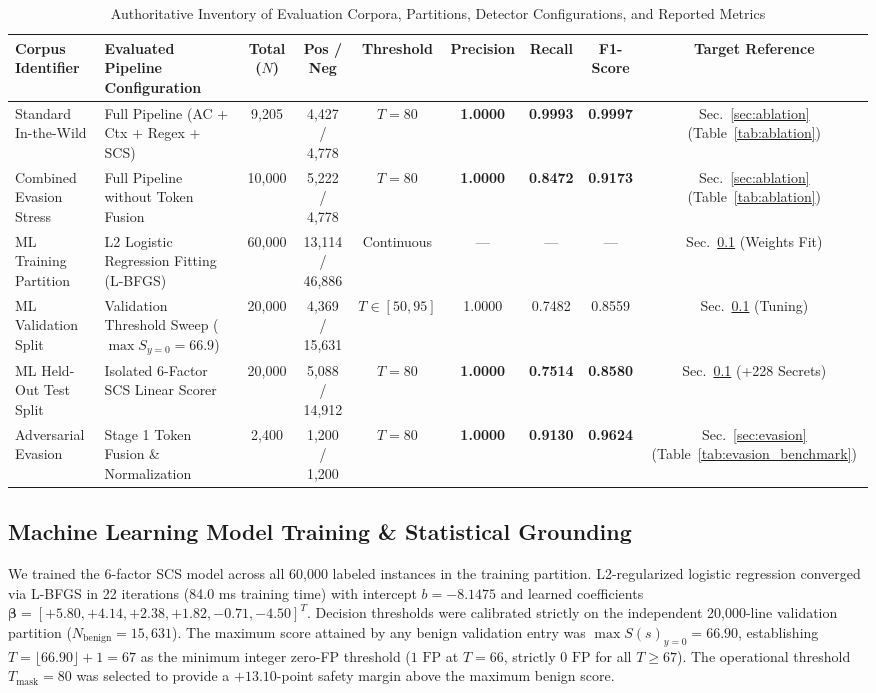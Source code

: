 \documentclass[conference]{IEEEtran}
\begin{document}
\begin{table}[t]
\caption{Authoritative Inventory of Evaluation Corpora, Partitions, Detector Configurations, and Reported Metrics}
\label{tab:dataset_inventory}
\centering
\footnotesize
\setlength{\tabcolsep}{3.5pt}
\begin{tabularx}{\textwidth}{p{2.8cm}Xccccccc}
\toprule
\textbf{Corpus Identifier} & \textbf{Evaluated Pipeline Configuration} & \textbf{Total ($N$)} & \textbf{Pos / Neg} & \textbf{Threshold} & \textbf{Precision} & \textbf{Recall} & \textbf{F1-Score} & \textbf{Target Reference} \\
\midrule
Standard In-the-Wild & Full Pipeline (AC + Ctx + Regex + SCS) & 9,205 & 4,427 / 4,778 & $T=80$ & \textbf{1.0000} & \textbf{0.9993} & \textbf{0.9997} & Sec.~\ref{sec:ablation} (Table~\ref{tab:ablation}) \\
Combined Evasion Stress & Full Pipeline without Token Fusion & 10,000 & 5,222 / 4,778 & $T=80$ & \textbf{1.0000} & \textbf{0.8472} & \textbf{0.9173} & Sec.~\ref{sec:ablation} (Table~\ref{tab:ablation}) \\
ML Training Partition & L2 Logistic Regression Fitting (L-BFGS) & 60,000 & 13,114 / 46,886 & Continuous & --- & --- & --- & Sec.~\ref{sec:ml_eval} (Weights Fit) \\
ML Validation Split & Validation Threshold Sweep ($\max S_{y=0}=66.9$) & 20,000 & 4,369 / 15,631 & $T \in [50, 95]$ & 1.0000 & 0.7482 & 0.8559 & Sec.~\ref{sec:ml_eval} (Tuning) \\
ML Held-Out Test Split & Isolated 6-Factor SCS Linear Scorer & 20,000 & 5,088 / 14,912 & $T=80$ & \textbf{1.0000} & \textbf{0.7514} & \textbf{0.8580} & Sec.~\ref{sec:ml_eval} (+228 Secrets) \\
Adversarial Evasion & Stage 1 Token Fusion \& Normalization & 2,400 & 1,200 / 1,200 & $T=80$ & \textbf{1.0000} & \textbf{0.9130} & \textbf{0.9624} & Sec.~\ref{sec:evasion} (Table~\ref{tab:evasion_benchmark}) \\
\bottomrule
\end{tabularx}
\end{table}

\subsection{Machine Learning Model Training \& Statistical Grounding}\label{sec:ml_eval}
We trained the 6-factor SCS model across all 60,000 labeled instances in the training partition. L2-regularized logistic regression converged via L-BFGS in 22 iterations (84.0 ms training time) with intercept $b = -8.1475$ and learned coefficients $\mathbf{\beta} = [+5.80, +4.14, +2.38, +1.82, -0.71, -4.50]^T$. Decision thresholds were calibrated strictly on the independent 20,000-line validation partition ($N_{\text{benign}} = 15,631$). The maximum score attained by any benign validation entry was $\max S(s)_{y=0} = 66.90$, establishing $T = \lfloor 66.90 \rfloor + 1 = 67$ as the minimum integer zero-FP threshold ($1\text{ FP}$ at $T=66$, strictly $0\text{ FP}$ for all $T \ge 67$). The operational threshold $T_{\text{mask}} = 80$ was selected to provide a $+13.10$-point safety margin above the maximum benign score.
\end{document}
